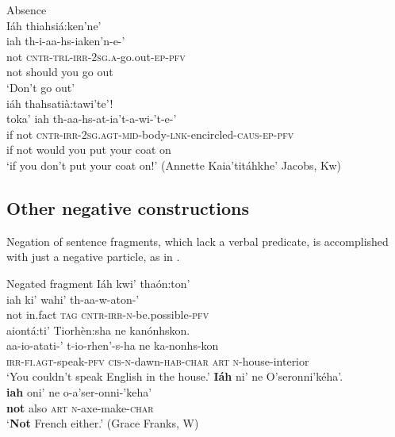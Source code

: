 \documentclass[output=paper,colorlinks,citecolor=brown]{langscibook}
\begin{document}
{\ea\label{ex:moh:87}Absence\\
    \gllll Iáh thiahsiá:ken’ne’ \\ 
          iah th-i-aa-hs-iaken’n-e-’ \\ 
          not \textsc{cntr-trl-irr-2sg.a-}go.out-\textsc{ep-pfv} \\
          not {should you go out} \\
    \glt ‘Don’t go out’\\ \medskip
     {iáh} {thahsatià:tawi’te’}! \\ 
            {toka’} {iah} {th-aa-hs-at-ia’t-a-wi-’t-e-’}\\ 
            {if} {not} {\textsc{cntr-irr-2sg.agt-mid-}body-\textsc{lnk}-encircled-\textsc{caus-ep-pfv}}\\ 
            {if} {not} {would you put your coat on}\\
    \glt ‘{if} {you} {don’t} {put} {your} {coat} {on!}’ (Annette Kaia’titáhkhe’ Jacobs, Kw) \\
\z }


\subsection{Other negative constructions}

Negation of sentence fragments, which lack a verbal predicate, is accomplished with just a negative particle, as in . 

\ea\label{ex:moh:88}Negated fragment  
    \ea  \glll Iáh		kwi’			thaón:ton’	 \\
                iah		ki’ wahi’		th-aa-w-aton-’		 \\
                not		in.fact \textsc{tag}		\textsc{cntr-irr-n}-be.possible-\textsc{pfv}	 \\
        \glt 
         {\hspace{6mm}} \glll aiontá:ti’	Tiorhèn:sha		ne	kanónhskon. \\
                aa-io-atati-’	t-io-rhen’-s-ha		ne	ka-nonhs-kon \\
                \textsc{irr-fi.agt}-speak-\textsc{pfv}		\textsc{cis-n}-dawn-\textsc{hab-char}	\textsc{art}	\textsc{n}-house-interior \\
        \glt ‘You couldn’t speak English in the house.’     
    \ex 
        \glll \textbf{Iáh} ni’ ne O’seronni’kéha’. \\
             \textbf{iah} oni’ ne o-a’ser-onni-’keha’ \\
             \textbf{not} also \textsc{art} \textsc{n-}axe-make-\textsc{char}\\
        \glt ‘\textbf{Not} French either.’ (Grace Franks, W)
    \z
\z
\end{document}
